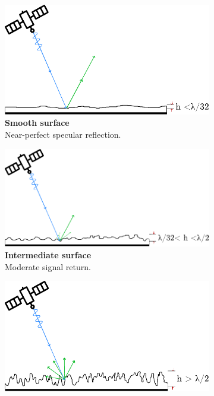 \begin{figure} [H]
    \centering
    \begin{subfigure}{0.31\textwidth}
        \includegraphics[width=\textwidth]{Figures/Theory/smoothSurface.pdf}
        \caption{\textbf{Smooth surface} \\ Near-perfect specular reflection.}
        \label{fig:theory.data.surface.smooth}
    \end{subfigure}   
    \begin{subfigure}{0.35\textwidth}
        \includegraphics[width=\textwidth]{Figures/Theory/intermediateSurface.pdf}
        \caption{\textbf{Intermediate surface} \\ Moderate signal return.}
        \label{fig:theory.data.surface.intermediate}
    \end{subfigure} 
    \begin{subfigure}{0.31\textwidth}
        \includegraphics[width=\textwidth]{Figures/Theory/roughSurface.pdf}

\end{subfigure}
\end{figure}
